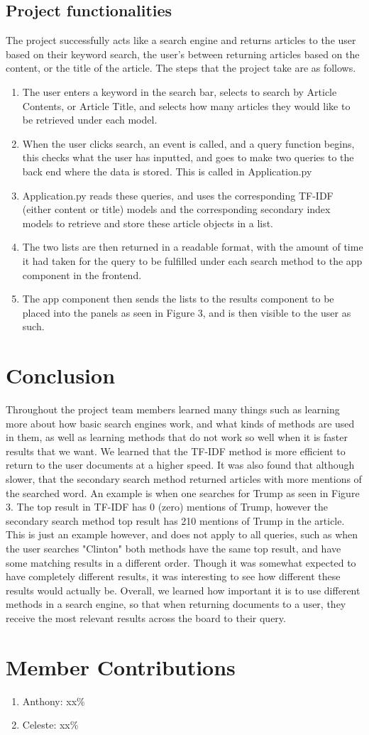 \documentclass{article}
\begin{document}
\subsection{Project functionalities}
The project successfully acts like a search engine and returns articles to the user based on their keyword search, the user's between returning articles based on the content, or the title of the article.
The steps that the project take are as follows.
\begin{enumerate}
    \item The user enters a keyword in the search bar, selects to search by Article Contents, or Article Title, and selects how many articles they would like to be retrieved under each model.
    \item When the user clicks search, an event is called, and a query function begins, this checks what the user has inputted, and goes to make two queries to the back end where the data is stored. This is called in Application.py
    \item Application.py reads these queries, and uses the corresponding TF-IDF (either content or title) models and the corresponding secondary index models to retrieve and store these article objects in a list.
    \item The two lists are then returned in a readable format, with the amount of time it had taken for the query to be fulfilled under each search method to the app component in the frontend.
    \item The app component then sends the lists to the results component to be placed into the panels as seen in Figure 3, and is then visible to the user as such.
\end{enumerate}
\section{Conclusion}
Throughout the project team members learned many things such as learning more about how basic search engines work, and what kinds of methods are used in them, as well as learning methods that do not work so well when it is faster results that we want.
We learned that the TF-IDF method is more efficient to return to the user documents at a higher speed.
It was also found that although slower, that the secondary search method returned articles with more mentions of the searched word.
An example is when one searches for Trump as seen in Figure 3. The top result in TF-IDF has 0 (zero) mentions of Trump, however the secondary search method top result has 210 mentions of Trump in the article.
This is just an example however, and does not apply to all queries, such as when the user searches "Clinton" both methods have the same top result, and have some matching results in a different order.
Though it was somewhat expected to have completely different results, it was interesting to see how different these results would actually be.
Overall, we learned how important it is to use different methods in a search engine, so that when returning documents to a user, they receive the most relevant results across the board to their query.

\section{Member Contributions}
\begin{enumerate}
    \item Anthony: xx\%
    \item Celeste: xx\%
\end{enumerate}
\end{document}
